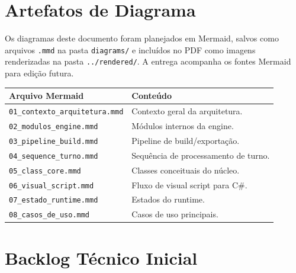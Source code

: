 \documentclass[12pt,a4paper]{article}
\begin{document}
\appendix
\section{Artefatos de Diagrama}

Os diagramas deste documento foram planejados em Mermaid, salvos como arquivos \texttt{.mmd} na pasta \texttt{diagrams/} e incluídos no PDF como imagens renderizadas na pasta \texttt{../rendered/}. A entrega acompanha os fontes Mermaid para edição futura.

\begin{longtable}{p{4.3cm}p{9.6cm}}
\toprule
\textbf{Arquivo Mermaid} & \textbf{Conteúdo} \\
\midrule
\texttt{01\_contexto\_arquitetura.mmd} & Contexto geral da arquitetura. \\
\texttt{02\_modulos\_engine.mmd} & Módulos internos da engine. \\
\texttt{03\_pipeline\_build.mmd} & Pipeline de build/exportação. \\
\texttt{04\_sequence\_turno.mmd} & Sequência de processamento de turno. \\
\texttt{05\_class\_core.mmd} & Classes conceituais do núcleo. \\
\texttt{06\_visual\_script.mmd} & Fluxo de visual script para C\#. \\
\texttt{07\_estado\_runtime.mmd} & Estados do runtime. \\
\texttt{08\_casos\_de\_uso.mmd} & Casos de uso principais. \\
\bottomrule
\end{longtable}

\section{Backlog Técnico Inicial}
\end{document}
